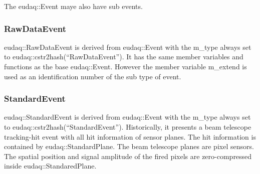 The eudaq::Event maye also have sub events. 

\subsubsection{RawDataEvent}\label{sec:convrawdata}
eudaq::RawDataEvent is derived from eudaq::Event with the m\_type always set to eudaq::cstr2hash(``RawDataEvent''). It has the same member variables and functions as the base eudaq::Event. However the member variable m\_extend is used as an identification number of the sub type of event.

\subsubsection{StandardEvent}\label{sec:convstddata}
eudaq::StandardEvent is derived from eudaq::Event with the m\_type always set to eudaq::cstr2hash(``StandardEvent''). Historically, it presents a beam telescope tracking-hit event with all hit information of sensor planes. The hit information is contained by eudaq::StandardPlane. The beam telescope planes are pixel sensors. The spatial position and signal amplitude of the fired pixels are zero-compressed inside eudaq::StandaredPlane.

